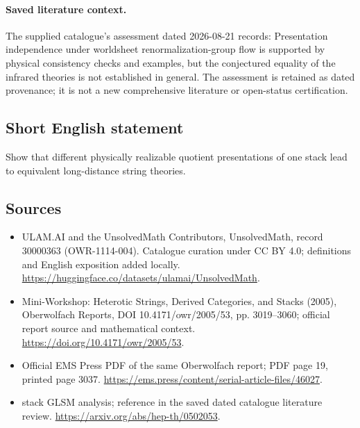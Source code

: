\documentclass[11pt]{article}
\begin{document}
\paragraph{Saved literature context.} The supplied catalogue's assessment dated 2026-08-21 records: Presentation independence under worldsheet renormalization-group flow is supported by physical consistency checks and examples, but the conjectured equality of the infrared theories is not established in general. The assessment is retained as dated provenance; it is not a new comprehensive literature or open-status certification.
\subsection{Short English statement}
Show that different physically realizable quotient presentations of one stack lead to equivalent long-distance string theories.
\subsection{Sources}
\begin{itemize}
\item[\hypertarget{source:30000363:1}{S1}] ULAM.AI and the UnsolvedMath Contributors, UnsolvedMath, record 30000363 (OWR-1114-004). Catalogue curation under CC BY 4.0; definitions and English exposition added locally.
\url{https://huggingface.co/datasets/ulamai/UnsolvedMath}.
\item[\hypertarget{source:30000363:2}{S2}] Mini-Workshop: Heterotic Strings, Derived Categories, and Stacks (2005), Oberwolfach Reports, DOI 10.4171/owr/2005/53, pp. 3019--3060; official report source and mathematical context.
\url{https://doi.org/10.4171/owr/2005/53}.
\item[\hypertarget{source:30000363:3}{S3}] Official EMS Press PDF of the same Oberwolfach report; PDF page 19, printed page 3037.
\url{https://ems.press/content/serial-article-files/46027}.
\item[\hypertarget{source:30000363:4}{S4}] stack GLSM analysis; reference in the saved dated catalogue literature review.
\url{https://arxiv.org/abs/hep-th/0502053}.
\end{itemize}
\label{end:30000363}
\end{document}
